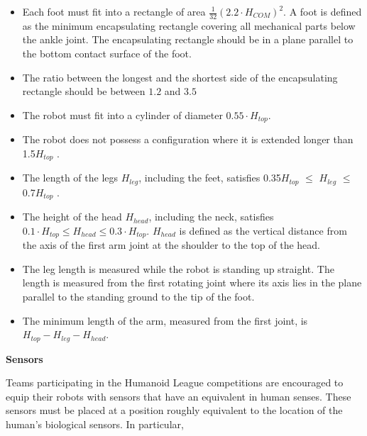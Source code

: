 \begin{itemize}
\item Each foot must fit into a rectangle of area $\tfrac{1}{32} (2.2 \cdot H_{COM})^2$.
      A foot is defined as the minimum encapsulating rectangle covering all
      mechanical parts below the ankle joint.
      The encapsulating rectangle should be in a plane parallel to the bottom
      contact surface of the foot.
\item The ratio between the longest and the shortest side of the encapsulating
      rectangle should be between $1.2$ and $3.5$
\item The robot must fit into a cylinder of diameter $0.55 \cdot H_{top}$.
\item The robot does not possess a configuration where it is extended longer than 1.5{\textperiodcentered}$H_{top}$ .
\item The length of the legs $H_{leg}$, including the feet, satisfies 0.35{\textperiodcentered}$H_{top}$ ${\leq}$ $H_{leg}$ ${\leq}$ 0.7{\textperiodcentered}$H_{top}$ .
\item The height of the head $H_{head}$, including the neck,
  satisfies $0.1 \cdot H_{top} \leq H_{head} \leq 0.3 \cdot H_{top}$.
  $H_{head}$ is defined as the vertical distance from the axis of the first arm
  joint at the shoulder to the top of the head.
\item The leg length is measured while the robot is standing up straight. The length is measured from the first rotating joint where its axis lies in the plane parallel to the standing ground to the tip of the foot.
\item The minimum length of the arm, measured from the first joint, is $H_{top} - H_{leg} - H_{head}$.
\end{itemize}


{\bfseries Sensors}

\headlinebox

Teams participating in the Humanoid League competitions are encouraged to equip their robots with sensors that have an equivalent in human senses. These sensors must be placed at a position roughly equivalent to the location of the human{\textquoteright}s biological sensors. In particular, 

